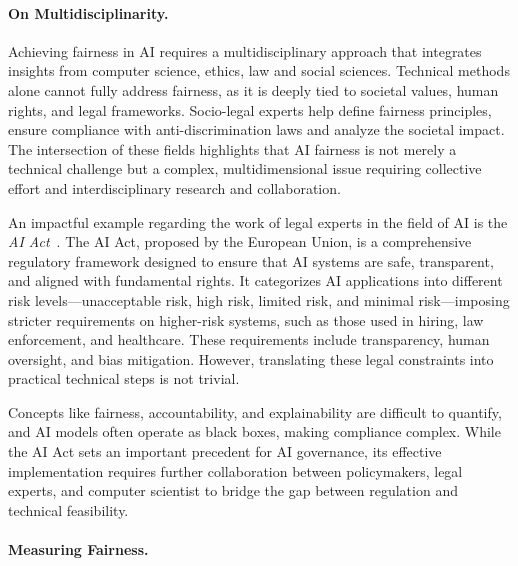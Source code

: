 \documentclass[12pt,a4paper,openright,twoside]{book}
\begin{document}
\paragraph{On Multidisciplinarity.}


Achieving fairness in \ac{AI} requires a multidisciplinary approach that integrates insights from computer science, ethics, law and social sciences.
%
Technical methods alone cannot fully address fairness, as it is deeply tied to societal values, human rights, and legal frameworks.
%
Socio-legal experts help define fairness principles, ensure compliance with anti-discrimination laws and analyze the societal impact.
%
The intersection of these fields highlights that \ac{AI} fairness is not merely a technical challenge but a complex, multidimensional issue requiring collective effort and interdisciplinary research and collaboration.


An impactful example regarding the work of legal experts in the field of \acl{AI} is the \textit{AI Act}~\cite{madiega2021artificial}.
%
The AI Act, proposed by the European Union, is a comprehensive regulatory framework designed to ensure that AI systems are safe, transparent, and aligned with fundamental rights.
%
It categorizes AI applications into different risk levels—unacceptable risk, high risk, limited risk, and minimal risk—imposing stricter requirements on higher-risk systems, such as those used in hiring, law enforcement, and healthcare.
%
These requirements include transparency, human oversight, and bias mitigation.
%
However, translating these legal constraints into practical technical steps is not trivial.

Concepts like fairness, accountability, and explainability are difficult to quantify, and AI models often operate as black boxes, making compliance complex.
%
While the AI Act sets an important precedent for AI governance, its effective implementation requires further collaboration between policymakers, legal experts, and computer scientist to bridge the gap between regulation and technical feasibility.


\paragraph{Measuring Fairness.}
\end{document}
